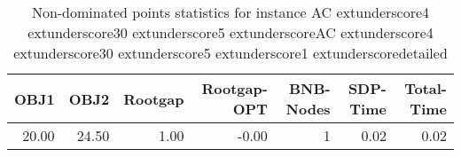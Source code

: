 \begin{table}
\caption{Non-dominated points statistics for instance AC	extunderscore4	extunderscore30	extunderscore5	extunderscoreAC	extunderscore4	extunderscore30	extunderscore5	extunderscore1	extunderscoredetailed}
\label{tab:stats/AC_4_30_5_AC_4_30_5_1_detailed}
\begin{tabular}{rrrrrrr}
\toprule
OBJ1 & OBJ2 & Rootgap & Rootgap-OPT & BNB-Nodes & SDP-Time & Total-Time \\
\midrule
20.00 & 24.50 & 1.00 & -0.00 & 1 & 0.02 & 0.02 \\
\bottomrule
\end{tabular}
\end{table}
